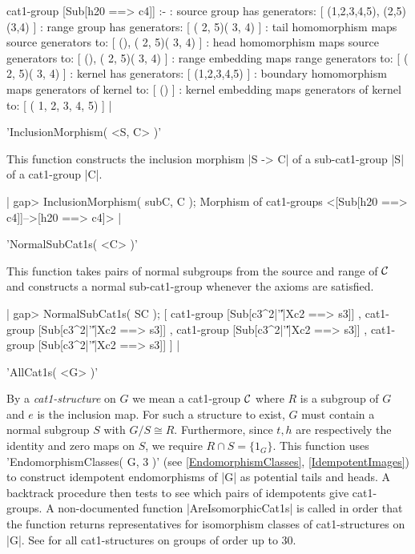     cat1-group [Sub[h20 ==> c4]] :- 
    : source group has generators:
      [ (1,2,3,4,5), (2,5)(3,4) ]
    :  range group has generators:
      [ ( 2, 5)( 3, 4) ]
    : tail homomorphism maps source generators to:
      [ (), ( 2, 5)( 3, 4) ]
    : head homomorphism maps source generators to:
      [ (), ( 2, 5)( 3, 4) ]
    : range embedding maps range generators to:
      [ ( 2, 5)( 3, 4) ]
    : kernel has generators:
      [ (1,2,3,4,5) ]
    : boundary homomorphism maps generators of kernel to:
      [ () ]
    : kernel embedding maps generators of kernel to:
      [ ( 1, 2, 3, 4, 5) ]   |

%

'InclusionMorphism( <S, C> )'

This function constructs the inclusion morphism |S -> C|
of a sub-cat1-group |S| of a cat1-group |C|.

|    gap> InclusionMorphism( subC, C );
    Morphism of cat1-groups <[Sub[h20 ==> c4]]-->[h20 ==> c4]>  |

%

'NormalSubCat1s( <C> )'

This function takes pairs of normal subgroups from the source and range
of ${\cal C}$ and constructs a normal sub-cat1-group whenever the axioms
are satisfied.

|    gap> NormalSubCat1s( SC );
    [ cat1-group [Sub[c3^2|'\|'|Xc2 ==> s3]] ,
      cat1-group [Sub[c3^2|'\|'|Xc2 ==> s3]] , 
      cat1-group [Sub[c3^2|'\|'|Xc2 ==> s3]] ,
      cat1-group [Sub[c3^2|'\|'|Xc2 ==> s3]]  ] |

%

'AllCat1s( <G> )'

By a {\em cat1-structure} on  $G$  we mean a cat1-group  ${\cal C}$
where  $R$  is a subgroup of  $G$  and  $e$  is the inclusion map.
For such a structure to exist,  $G$  must contain a normal subgroup  $S$
with  $G/S \cong R$.  Furthermore, since  $t,h$  are respectively the
identity and zero maps on  $S$,  we require  $R \cap S = \{ 1_G \}$.
This function uses 'EndomorphismClasses( G, 3 )' 
(see \ref{EndomorphismClasses}, \ref{IdempotentImages})
to construct idempotent endomorphisms of |G| as potential tails and heads.
A backtrack procedure then tests to see which pairs of idempotents
give cat1-groups.  A non-documented function 
|AreIsomorphicCat1s| is called in order that the function returns 
representatives for isomorphism classes of cat1-structures on |G|.
See \cite{AW1} for all cat1-structures on groups of order up to 30.

